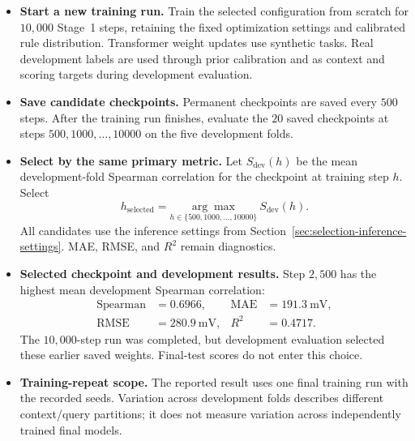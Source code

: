 \documentclass[11pt]{article}
\newenvironment{notes}
  {\begin{itemize}\setlength{\itemsep}{0.45em}\setlength{\parsep}{0pt}}
  {\end{itemize}}
\begin{document}
\begin{notes}
    \item \textbf{Start a new training run.}
    Train the selected configuration from scratch for
    \(10{,}000\) Stage~1 steps, retaining the fixed
    optimization settings and calibrated rule distribution.
    Transformer weight updates use synthetic tasks.
    Real development labels are used through prior
    calibration and as context and scoring targets during
    development evaluation.

    \item \textbf{Save candidate checkpoints.}
    Permanent checkpoints are saved every \(500\) steps.
    After the training run finishes, evaluate the \(20\)
    saved checkpoints at steps
    \(500,1000,\ldots,10000\) on the five development folds.

    \item \textbf{Select by the same primary metric.}
    Let \(S_{\mathrm{dev}}(h)\) be the mean development-fold
    Spearman correlation for the checkpoint at training step
    \(h\). Select
    \begin{equation}
        h_{\mathrm{selected}}
        =
        \underset{h\in\{500,1000,\ldots,10000\}}{\arg\max}
        \ S_{\mathrm{dev}}(h).
        \label{eq:checkpoint-selection}
    \end{equation}
    All candidates use the inference settings from
    Section~\ref{sec:selection-inference-settings}.
    MAE, RMSE, and \(R^2\) remain diagnostics.

    \item \textbf{Selected checkpoint and development results.}
    Step \(2{,}500\) has the highest mean development
    Spearman correlation:
    \[
    \begin{aligned}
        \text{Spearman}&=0.6966,&
        \text{MAE}&=191.3\ \text{mV},\\
        \text{RMSE}&=280.9\ \text{mV},&
        R^2&=0.4717.
    \end{aligned}
    \]
    The \(10{,}000\)-step run was completed, but development
    evaluation selected these earlier saved weights.
    Final-test scores do not enter this choice.

    \item \textbf{Training-repeat scope.}
    The reported result uses one final training run with
    the recorded seeds. Variation across development folds
    describes different context/query partitions; it does
    not measure variation across independently trained
    final models.
\end{notes}
\end{document}
